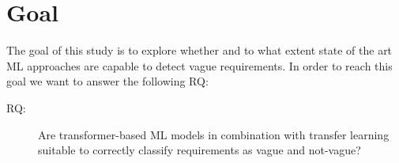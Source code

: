 \section{Goal}
\label{chp:study:sec:goal}
The goal of this study is to explore whether and to what extent state of the art \ac{ML} approaches are capable to detect vague requirements.
In order to reach this goal we want to answer the following \ac{RQ}:

\begin{description}
    \item[\Ac{RQ}:] Are transformer-based \ac{ML} models in combination with transfer learning suitable to correctly classify requirements as vague and not-vague?
\end{description}
